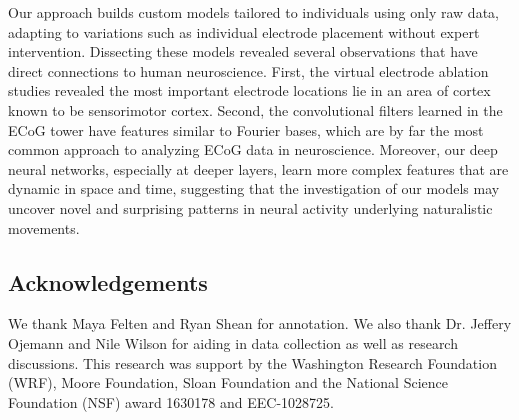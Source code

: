 \documentclass[letterpaper]{article} %
\begin{document}
Our approach builds custom models tailored to individuals using only raw data, adapting to variations such as individual electrode placement without expert intervention.
Dissecting these models revealed several observations that have direct connections to human neuroscience.
First, the virtual electrode ablation studies revealed the most important electrode locations lie in an area of cortex known to be sensorimotor cortex.
Second, the convolutional filters learned in the ECoG tower have features similar to Fourier bases, which are by far the most common approach to analyzing ECoG data in neuroscience.
Moreover, our deep neural networks, especially at deeper layers, learn more complex features that are dynamic in space and time, suggesting that the investigation of our models may uncover novel and surprising patterns in neural activity underlying naturalistic movements. 

\subsection{Acknowledgements}

We thank Maya Felten and Ryan Shean for annotation. We also thank Dr. Jeffery Ojemann and Nile Wilson for aiding in data collection as well as research discussions. This research was support by the Washington Research Foundation (WRF), Moore Foundation, Sloan Foundation and the National Science Foundation (NSF) award 1630178 and EEC-1028725.





\small


\end{document}
